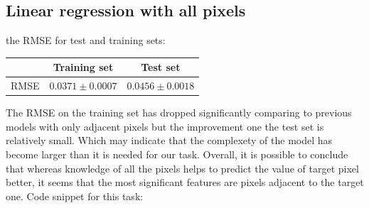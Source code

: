 \documentclass{article}
\begin{document}
		\subsection{Linear regression with all pixels}
			the RMSE for test and training sets:
			\begin{center}
				\begin{tabular}{| c | c | c |}
					\hline
					\, & Training set & Test set \\ \hline
					RMSE  &  $0.0371 \pm 0.0007$ & $0.0456 \pm 0.0018$ \\ 
					\hline
				\end{tabular}
			\end{center}
			The RMSE on the training set has dropped significantly comparing to previous models with only adjacent pixels but the improvement one the test set is relatively small. Which may indicate that the complexety of the model has become larger than it is needed for our task. Overall, it is possible to conclude that whereas knowledge of all the pixels helps to predict the value of target pixel better, it seems that the most significant features are pixels adjacent to the target one.
			Code snippet for this task:
			
\end{document}
